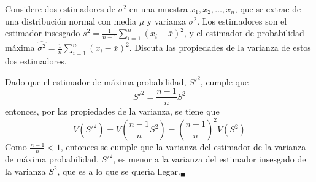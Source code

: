 \begin{enunciado}
 Considere dos estimadores de $\sigma^2$ en una muestra $x_1, x_2, \ldots, x_n$, que se extrae de una distribuci\'on normal con media $\mu$ y varianza $\sigma^2$. Los estimadores son el estimador insesgado $s^2 = \frac{1}{n-1}\sum_{i=1}^n \left( x_i - \bar{x} \right)^2$, y el estimador de probabilidad m\'axima $\widehat{\sigma^2} = \frac{1}{n} \sum_{i=1}^n \left( x_i - \bar{x} \right)^2$. Discuta las propiedades de la varianza de estos dos estimadores.
\end{enunciado}

\begin{solucion}
 Dado que el estimador de m\'axima probabilidad, $S'^2$, cumple que
 \begin{equation*}
  S'^2 = \frac{n-1}{n}S^2
 \end{equation*}
 entonces, por las propiedades de la varianza, se tiene que
 \begin{equation*}
  V\left( S'^2 \right) = V\left( \frac{n-1}{n}S^2 \right) = \left( \frac{n-1}{n} \right)^2 V(S^2)
 \end{equation*}
 Como $\frac{n-1}{n} < 1$, entonces se cumple que la varianza del estimador de la varianza de m\'axima probabilidad, $S'^2$, es menor a la varianza del estimador insesgado de la varianza $S^2$, que es a lo que se quer\'{\i}a llegar.${}_{\blacksquare}$
\end{solucion}
